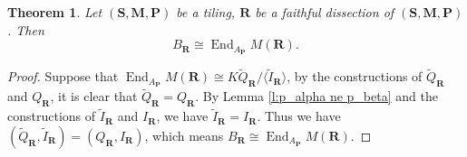 \documentclass[a4paper,10pt]{amsart}
\theoremstyle{plain}          %
\newtheorem{theorem}{Theorem}[section]
\theoremstyle{definition}
\newtheorem{remark}[theorem]{Remark}
\def\SS{\mathbf{S}}
\def\RR{\mathbf{R}}
\def\MM{\mathbf{M}}
\def\PP{\mathbf{P}}
\def\MM{\mathbf{M}}
\newcommand{\End}{\operatorname{End}\nolimits}
\begin{document}
\begin{theorem}\label{t:iso for end}
    Let $(\SS,\MM,\PP)$ be a tiling, $\mathbf{R}$ be a faithful dissection of $(\SS,\MM,\PP)$. Then $$B_{\RR}\cong \End_{A_{\PP}}M(\mathbf{R}).$$
\end{theorem}
\begin{proof}
Suppose that $\End_{A_{\PP}} M(\mathbf{R}) \cong K\widetilde{Q}_{\mathbf{R}}/\langle \widetilde{I}_{\mathbf{R}}\rangle$, by the constructions of $\widetilde{Q}_{\mathbf{R}}$ and $Q_{\RR}$, it is clear that $\widetilde{Q}_{\mathbf{R}}=Q_{\RR}$. By Lemma \ref{l:p_alpha ne p_beta} and the constructions of $\widetilde{I}_{\mathbf{R}}$ and $I_{\RR}$, we have $\widetilde{I}_{\mathbf{R}}={I}_{\mathbf{R}}$. Thus we have
$(\widetilde{Q}_{\mathbf{R}},\widetilde{I}_{\mathbf{R}})=(Q_{\RR},I_{\RR})$, which means $B_{\RR}\cong \End_{A_{\PP}}M(\mathbf{R}).$
\end{proof}
\end{document}
